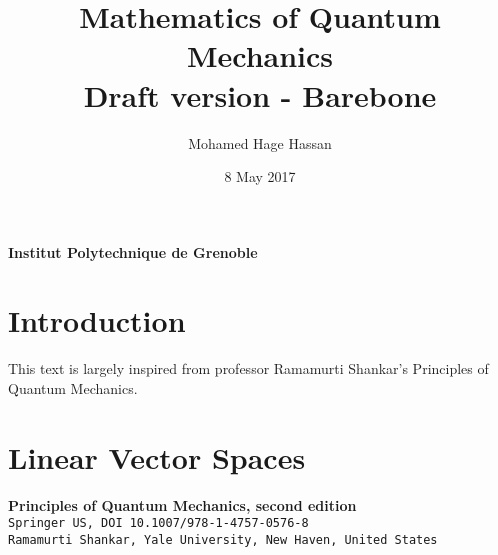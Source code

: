\documentclass[11pt]{article}
\begin{document}
\title{\textbf{Mathematics of Quantum Mechanics} \\ Draft version - Barebone}
\author{Mohamed Hage Hassan}
\date{8 May 2017}
\maketitle
\thispagestyle{empty}

\begin{abstract}
     
\end{abstract}

\vskip 9.5cm
\begin{center} \textbf{Institut Polytechnique de Grenoble} \end{center}

\clearpage
\tableofcontents

\clearpage

\section{Introduction}

This text is largely inspired from professor Ramamurti Shankar's Principles of Quantum Mechanics\cite{Principles of Quantum Mechanics}.

\section{Linear Vector Spaces}

\clearpage


\begin{thebibliography}{9}
\textbf{Principles of Quantum Mechanics, second edition}\\
\texttt{Springer US, DOI 10.1007/978-1-4757-0576-8}\\
\texttt{Ramamurti Shankar, Yale University, New Haven, United States}\\

\end{thebibliography}
\end{document}
